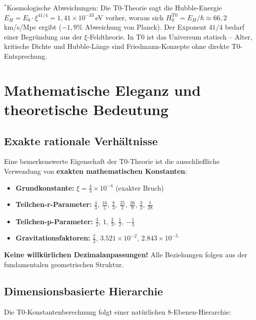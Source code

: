 	{\small $^*$Kosmologische Abweichungen: Die T0-Theorie sagt die Hubble-Energie $E_H = E_0 \cdot \xi^{41/4} = 1{,}41 \times 10^{-33}\,$eV vorher, woraus sich $H_0^{\text{T0}} = E_H/\hbar \approx 66{,}2\,$km/s/Mpc ergibt ($-1{,}9\%$ Abweichung von Planck). Der Exponent $41/4$ bedarf einer Begründung aus der $\xi$-Feldtheorie. In T0 ist das Universum statisch -- Alter, kritische Dichte und Hubble-Länge sind Friedmann-Konzepte ohne direkte T0-Entsprechung.}
	
	\section{Mathematische Eleganz und theoretische Bedeutung}
	
	\subsection{Exakte rationale Verhältnisse}
	
	Eine bemerkenswerte Eigenschaft der T0-Theorie ist die ausschließliche Verwendung von \textbf{exakten mathematischen Konstanten}:
	
	\begin{itemize}
		\item \textbf{Grundkonstante:} $\xi = \frac{4}{3} \times 10^{-4}$ (exakter Bruch)
		\item \textbf{Teilchen-r-Parameter:} $\frac{4}{3}$, $\frac{16}{5}$, $\frac{8}{3}$, $\frac{25}{2}$, $\frac{26}{9}$, $\frac{3}{2}$, $\frac{1}{28}$
		\item \textbf{Teilchen-p-Parameter:} $\frac{3}{2}$, $1$, $\frac{2}{3}$, $\frac{1}{2}$, $-\frac{1}{3}$
		\item \textbf{Gravitationsfaktoren:} $\frac{\xi}{2}$, $3.521 \times 10^{-2}$, $2.843 \times 10^{-5}$
	\end{itemize}
	
	\textcolor{t0green}{\textbf{Keine willkürlichen Dezimalanpassungen!}} Alle Beziehungen folgen aus der fundamentalen geometrischen Struktur.
	
	\subsection{Dimensionsbasierte Hierarchie}
	
	Die T0-Konstantenberechnung folgt einer natürlichen 8-Ebenen-Hierarchie:
	
